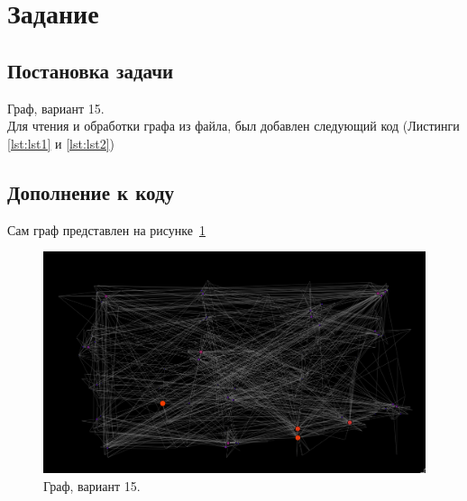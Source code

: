 \section{Задание}

\subsection{Постановка задачи}

Граф, вариант 15.\\

Для чтения и обработки графа из файла, был добавлен следующий код (Листинги \ref{lst:lst1} и \ref{lst:lst2})

\subsection{Дополнение к коду}
\captionsetup{singlelinecheck = false, justification=raggedright}

\newpage


Сам граф представлен на рисунке~\ref{fig:graph}

\begin{figure}[H]
    \centering
    \includegraphics[scale=0.5,width=\textwidth]{inc/img/graph}
    \caption{Граф, вариант 15.}
    \label{fig:graph}
\end{figure}

